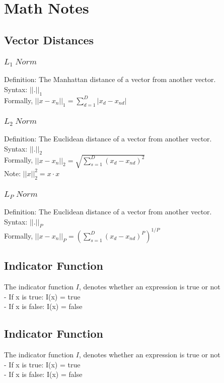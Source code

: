 \documentclass{article}
\begin{document}
\section{Math Notes}
\subsection{Vector Distances}
\subsubsection{$L_1\;Norm$}
Definition: The Manhattan distance of a vector from another vector.\\
Syntax: $||.||_1$\\
Formally, $||x-x_n||_1 = \sum^D_{d=1}{|x_d - x_{nd}|}$

\subsubsection{$L_2\;Norm$}
Definition: The Euclidean distance of a vector from another vector.\\
Syntax: $||.||_2$\\
Formally, $||x-x_n||_2 = \sqrt{\sum^D_{s=1}{(x_d - x_{nd})^2}}$\\
Note: $||x||_2^2 = x \cdot x $

\subsubsection{$L_P\;Norm$}
Definition: The Euclidean distance of a vector from another vector.\\
Syntax: $||.||_P$\\
Formally, $||x-x_n||_P = (\sum^D_{s=1}{(x_d - x_{nd})^P})^{1/P}$

\subsection{Indicator Function}
The indicator function $I$, denotes whether an expression is true or not\\
- If x is true: I(x) = true\\
- If x is false: I(x) = false

\subsection{Indicator Function}
The indicator function $I$, denotes whether an expression is true or not\\
- If x is true: I(x) = true\\
- If x is false: I(x) = false
\end{document}
